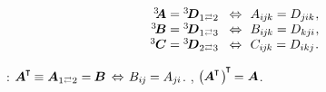 \nopagebreak\vspace{-0.2em}\begin{equation}\label{tensoralgebra:transposing}
\begin{array}{rcl}
{^3\hspace{-0.3em}\bm{A}} = {^3\hspace{-0.16em}\bm{D}}_{\indexjuggling{1}{2}}
& \!\Leftrightarrow\!\! &
A_{i\hspace{-0.1ex}j\hspace{-0.1ex}k} = D_{j\hspace{-0.06ex}ik}
\hspace{.1ex} ,
\\
{^3\hspace{-0.15em}\bm{B}} = {^3\hspace{-0.16em}\bm{D}}_{\indexjuggling{1}{3}}
& \!\Leftrightarrow\!\! &
B_{i\hspace{-0.1ex}j\hspace{-0.1ex}k} = D_{kj\hspace{-0.06ex}i}
\hspace{.1ex} ,
\\
{^3\hspace{-0.05em}\bm{C}} = {^3\hspace{-0.16em}\bm{D}}_{\indexjuggling{2}{3}}
& \!\Leftrightarrow\!\! &
C_{i\hspace{-0.1ex}j\hspace{-0.1ex}k} = D_{ikj}
\hspace{.1ex} .
\end{array}
\end{equation}

\en{,}
:
${\bm{A}^{\hspace{-0.05em}\T} \hspace{-0.15ex} \equiv \bm{A}_{\indexjuggling{1}{2}} = \hspace{-0.1ex} \bm{B}
\hspace{.4ex}\Leftrightarrow\hspace{.25ex}
B_{i\hspace{-0.1ex}j} \hspace{-0.1ex} = A_{j\hspace{-0.06ex}i}}$.
,
${\bigl( \hspace{-0.1ex} \bm{A}^{\hspace{-0.05em}\T} \hspace{.15ex} \bigr)^{\hspace{-0.25ex}\T} \hspace{-0.2ex} = \bm{A}}$.

